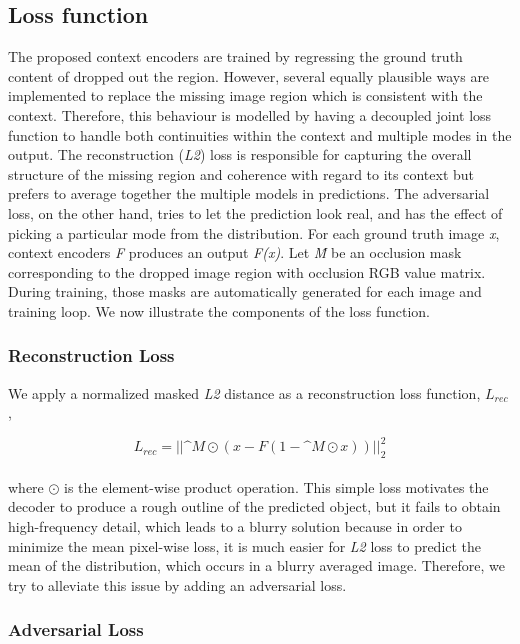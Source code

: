 \subsection{Loss function}
The proposed context encoders are trained by regressing the ground truth content of dropped out the region. However, several equally plausible ways are implemented to replace the missing image region which is consistent with the context. Therefore, this behaviour is modelled by having a decoupled joint loss function to handle both continuities within the context and multiple modes in the output. The reconstruction (\emph{L2}) loss is responsible for capturing the overall structure of the missing region and coherence with regard to its context but prefers to average together the multiple models in predictions. The adversarial loss, on the other hand, tries to let the prediction look real, and has the effect of picking a particular mode from the distribution. For each ground truth image \emph{x}, context encoders \emph{F} produces an output \emph{F(x)}. Let \emph{\^{M}} be an occlusion mask corresponding to the dropped image region with occlusion RGB value matrix. During training, those masks are automatically generated for each image and training loop. We now illustrate the components of the loss function. 

\subsubsection{Reconstruction Loss}
We apply a normalized masked \emph{L2} distance as a reconstruction loss function, $L_{rec}$,

\begin{equation}
    L_{rec}= || \^{M}\textstyle\odot(x-F(1-\^{M}\textstyle\odot x))||^{2}_{2}
\end{equation}
\\
where $\textstyle\odot$  is the element-wise product operation. This simple loss motivates the decoder to produce a rough outline of the predicted object, but it fails to obtain high-frequency detail, which leads to a blurry solution \cite{ce} because in order to minimize the mean pixel-wise loss, it is much easier for \emph{L2} loss to predict the mean of the distribution, which occurs in a blurry averaged image. Therefore, we try to alleviate this issue by adding an adversarial loss.

\subsubsection{Adversarial Loss}

